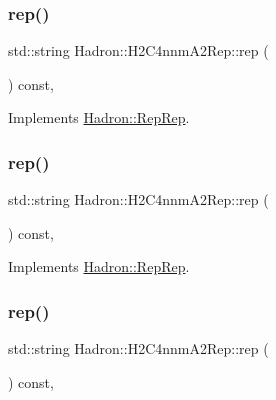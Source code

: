 \subsubsection{\texorpdfstring{rep()}{rep()}\hspace{0.1cm}{\footnotesize\ttfamily [1/3]}}
{\footnotesize\ttfamily std\+::string Hadron\+::\+H2\+C4nnm\+A2\+Rep\+::rep (\begin{DoxyParamCaption}{ }\end{DoxyParamCaption}) const\hspace{0.3cm}{\ttfamily [inline]}, {\ttfamily [virtual]}}



Implements \mbox{\hyperlink{structHadron_1_1RepRep_ab3213025f6de249f7095892109575fde}{Hadron\+::\+Rep\+Rep}}.

\mbox{\label{structHadron_1_1H2C4nnmA2Rep_ab3b885d6ae0238dfffab82f55bbf4a2d}} 
\subsubsection{\texorpdfstring{rep()}{rep()}\hspace{0.1cm}{\footnotesize\ttfamily [2/3]}}
{\footnotesize\ttfamily std\+::string Hadron\+::\+H2\+C4nnm\+A2\+Rep\+::rep (\begin{DoxyParamCaption}{ }\end{DoxyParamCaption}) const\hspace{0.3cm}{\ttfamily [inline]}, {\ttfamily [virtual]}}



Implements \mbox{\hyperlink{structHadron_1_1RepRep_ab3213025f6de249f7095892109575fde}{Hadron\+::\+Rep\+Rep}}.

\mbox{\label{structHadron_1_1H2C4nnmA2Rep_ab3b885d6ae0238dfffab82f55bbf4a2d}} 
\subsubsection{\texorpdfstring{rep()}{rep()}\hspace{0.1cm}{\footnotesize\ttfamily [3/3]}}
{\footnotesize\ttfamily std\+::string Hadron\+::\+H2\+C4nnm\+A2\+Rep\+::rep (\begin{DoxyParamCaption}{ }\end{DoxyParamCaption}) const\hspace{0.3cm}{\ttfamily [inline]}, {\ttfamily [virtual]}}



